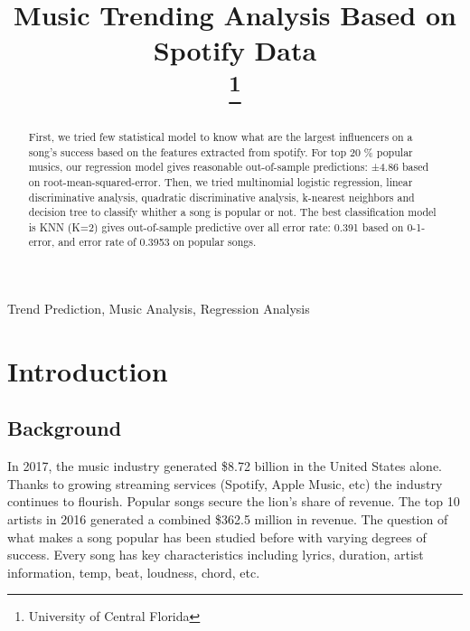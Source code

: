 \documentclass[conference]{IEEEtran}
\begin{document}
\title{Music Trending Analysis Based on Spotify Data\\
\thanks{University of Central Florida}
}

\author{
}

\maketitle

\begin{abstract}
First, we tried few statistical model to know what are the largest influencers on a song’s success based on the features extracted from spotify. For top 20 \% popular musics, our regression model gives reasonable out-of-sample predictions: ±4.86 based on root-mean-squared-error.
Then, we tried multinomial logistic regression, linear discriminative analysis, quadratic discriminative analysis, k-nearest neighbors and decision tree to classify whither a song is popular or not. The best classification model is KNN (K=2) gives out-of-sample predictive over all error rate: 0.391 based on 0-1-error, and error rate of 0.3953 on popular songs.
\end{abstract}

\begin{IEEEkeywords}
Trend Prediction, Music Analysis, Regression Analysis
\end{IEEEkeywords}

\section{Introduction}
\subsection{Background}
In 2017, the music industry generated \$8.72 billion in the United States alone. Thanks to growing streaming services (Spotify, Apple Music, etc) the industry continues to flourish. Popular songs secure the lion’s share of revenue. The top 10 artists in 2016 generated a combined \$362.5 million in revenue. The question of what makes a song popular has been studied before with varying degrees of success. Every song has key characteristics including lyrics, duration, artist information, temp, beat, loudness, chord, etc.
\end{document}
